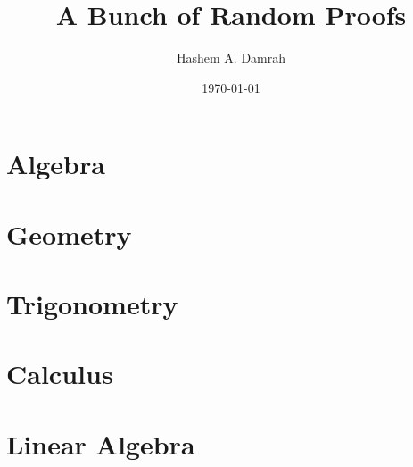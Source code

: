 \documentclass{book}
\title{A Bunch of Random Proofs}
\author{Hashem A. Damrah}
\date{\today}
\begin{document}
  \pagestyle{empty}
  \maketitle
  \newpage
  \tableofcontents
  \newpage

  \pagestyle{fancy}

  \chapter{Algebra}
  

  \newpage

  \chapter{Geometry}
  

  \newpage

  \chapter{Trigonometry}
  

  \newpage

  \chapter{Calculus}
  

  \newpage

  \chapter{Linear Algebra}
  
\end{document}
